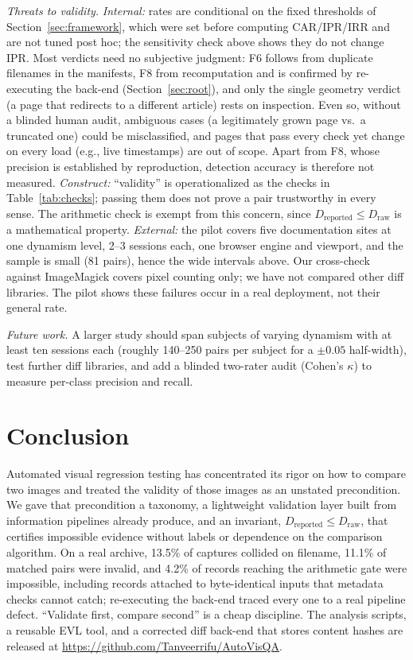 \documentclass[conference]{IEEEtran}
\newcommand{\Dr}{D_{\mathrm{reported}}}
\newcommand{\Dw}{D_{\mathrm{raw}}}
\begin{document}
\textit{Threats to validity.} \emph{Internal:} rates are conditional on the fixed thresholds of Section~\ref{sec:framework}, which were set before computing CAR/IPR/IRR and are not tuned post hoc; the sensitivity check above shows they do not change IPR. Most verdicts need no subjective judgment: F6 follows from duplicate filenames in the manifests, F8 from recomputation and is confirmed by re-executing the back-end (Section~\ref{sec:root}), and only the single geometry verdict (a page that redirects to a different article) rests on inspection. Even so, without a blinded human audit, ambiguous cases (a legitimately grown page vs.\ a truncated one) could be misclassified, and pages that pass every check yet change on every load (e.g., live timestamps) are out of scope. Apart from F8, whose precision is established by reproduction, detection accuracy is therefore not measured. \emph{Construct:} ``validity'' is operationalized as the checks in Table~\ref{tab:checks}; passing them does not prove a pair trustworthy in every sense. The arithmetic check is exempt from this concern, since $\Dr\le\Dw$ is a mathematical property. \emph{External:} the pilot covers five documentation sites at one dynamism level, 2--3 sessions each, one browser engine and viewport, and the sample is small (81 pairs), hence the wide intervals above. Our cross-check against ImageMagick covers pixel counting only; we have not compared other diff libraries. The pilot shows these failures occur in a real deployment, not their general rate.

\textit{Future work.} A larger study should span subjects of varying dynamism with at least ten sessions each (roughly 140--250 pairs per subject for a $\pm0.05$ half-width), test further diff libraries, and add a blinded two-rater audit (Cohen's $\kappa$) to measure per-class precision and recall.

\section{Conclusion}
Automated visual regression testing has concentrated its rigor on how to compare two images and treated the validity of those images as an unstated precondition. We gave that precondition a taxonomy, a lightweight validation layer built from information pipelines already produce, and an invariant, $\Dr\le\Dw$, that certifies impossible evidence without labels or dependence on the comparison algorithm. On a real archive, 13.5\% of captures collided on filename, 11.1\% of matched pairs were invalid, and 4.2\% of records reaching the arithmetic gate were impossible, including records attached to byte-identical inputs that metadata checks cannot catch; re-executing the back-end traced every one to a real pipeline defect. ``Validate first, compare second'' is a cheap discipline. The analysis scripts, a reusable EVL tool, and a corrected diff back-end that stores content hashes are released at \url{https://github.com/Tanveerrifu/AutoVisQA}.
\end{document}
